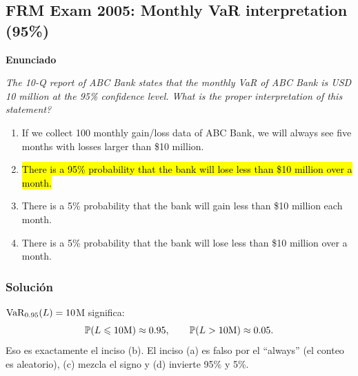 ﻿\subsection{FRM Exam 2005: Monthly VaR interpretation (95\%)}

\textbf{Enunciado}

\emph{The 10-Q report of ABC Bank states that the monthly
VaR of ABC Bank is USD 10 million at the 95\% confidence level. What is
the proper interpretation of this statement?}
\begin{enumerate}[label=\alph*.]
\item {If we collect 100 monthly gain/loss data of ABC Bank, we will always see five months with losses larger than \$10 million.}
\item \hl{There is a 95\% probability that the bank will lose less than \$10 million over a month.}
\item {There is a 5\% probability that the bank will gain less than \$10 million each month.}
\item {There is a 5\% probability that the bank will lose less than \$10 million over a month.}
\end{enumerate}

\subsubsection*{Solución}


\(\mathrm{VaR}_{0.95}(L)=10\)M significa:
\[
\mathbb{P}(L\leqslant 10\text{M})\approx 0.95,\qquad \mathbb{P}(L>10\text{M})\approx 0.05.
\]
Eso es exactamente el inciso (b). El inciso (a) es falso por el ``always'' (el conteo es aleatorio), (c) mezcla el signo y (d) invierte 95\% y 5\%.











